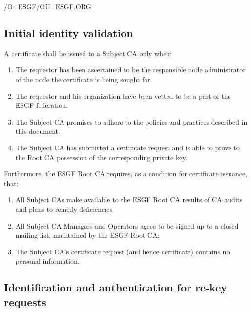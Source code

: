 /O=ESGF/OU=ESGF.ORG

\subsection{Initial identity validation}\label{initial-identity-validation}

A certificate shall be issued to a Subject CA only when:

\begin{enumerate}
\item
  
  The requestor has been ascertained to be the responsible node administrator of the node the certificate is being sought for.
  
\item
 The requestor and his organization have been vetted to be a part of the ESGF federation.
 
\item  
  The Subject CA promises to adhere to the policies and practices described in this document.
  
\item
  
  The Subject CA has submitted a certificate request and is able to
  prove to the Root CA possession of the corresponding private key.
  
\end{enumerate}

Furthermore, the ESGF Root CA requires, as a condition for
certificate issuance, that:

\begin{enumerate}
\item
  
  All Subject CAs make available to the ESGF Root CA results of CA
  audits and plans to remedy deficiencies
  
\item
  
  All Subject CA Managers and Operators agree to be signed up to a
  closed mailing list, maintained by the ESGF Root CA;
  
\item
  
  The Subject CA's certificate request (and hence certificate) contains
  no personal information.
  
\end{enumerate}

\subsection{Identification and authentication for re-key requests}\label{identification-and-authentication-for-re-key-requests}

